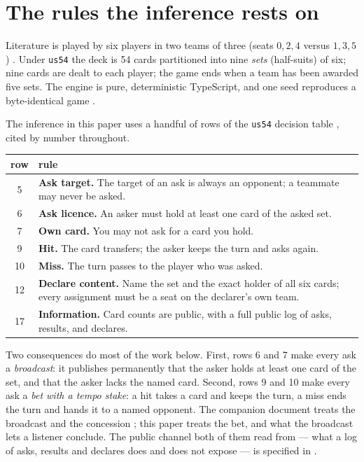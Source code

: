 \documentclass[11pt]{article}
\newcommand{\code}[1]{\texttt{#1}}
\newcommand{\usff}{\code{us54}}
\begin{document}
\section{The rules the inference rests on}
\label{sec:rules}

Literature is played by six players in two teams of three (seats $0,2,4$ versus $1,3,5$)
\cite{pagat}. Under \usff{} \cite{rules54} the deck is 54 cards partitioned into nine
\emph{sets} (half-suits) of six; nine cards are dealt to each player; the game ends when a
team has been awarded five sets. The engine is pure, deterministic TypeScript, and one
seed reproduces a byte-identical game \cite{repo,v05paper}.

The inference in this paper uses a handful of rows of the \usff{} decision table
\cite{rules54}, cited by number throughout.

\begin{center}
\small
\begin{tabular}{@{}c p{}@{}}
\toprule
row & rule \\
\midrule
5  & \textbf{Ask target.} The target of an ask is always an opponent; a teammate may
     never be asked. \\
6  & \textbf{Ask licence.} An asker must hold at least one card of the asked set. \\
7  & \textbf{Own card.} You may not ask for a card you hold. \\
9  & \textbf{Hit.} The card transfers; the asker keeps the turn and asks again. \\
10 & \textbf{Miss.} The turn passes to the player who was asked. \\
12 & \textbf{Declare content.} Name the set and the exact holder of all six cards; every
     assignment must be a seat on the declarer's own team. \\
17 & \textbf{Information.} Card counts are public, with a full public log of asks,
     results, and declares. \\
\bottomrule
\end{tabular}
\end{center}

Two consequences do most of the work below. First, rows 6 and 7 make every ask a
\emph{broadcast}: it publishes permanently that the asker holds at least one card of the
set, and that the asker lacks the named card. Second, rows 9 and 10 make every ask a
\emph{bet with a tempo stake}: a hit takes a card and keeps the turn, a miss ends the turn
and hands it to a named opponent. The companion document treats the broadcast and the
concession \cite{concession}; this paper treats the bet, and what the broadcast lets a
listener conclude. The public channel both of them read from --- what a log of asks,
results and declares does and does not expose --- is specified in \cite{obspaper}.
\end{document}
